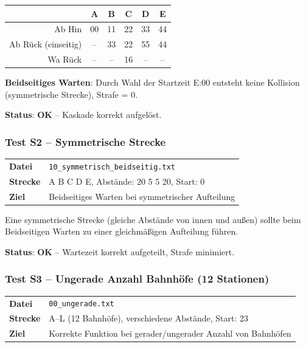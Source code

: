 \documentclass[12pt,a4paper]{article}
\newcommand{\pass}{\textcolor{passgreen}{\textbf{OK}}}
\begin{document}
\begin{center}
\begin{tabular}{r|ccccc}
 & A & B & C & D & E \\
\hline
Ab Hin & 00 & 11 & 22 & 33 & 44 \\
\hline
Ab Rück (einseitig) & -- & 33 & 22 & 55 & 44 \\
Wa Rück & -- & -- & 16 & -- & -- \\
\end{tabular}
\end{center}

\textbf{Beidseitiges Warten}: Durch Wahl der Startzeit E:00 entsteht keine Kollision (symmetrische Strecke), Strafe = 0.

\textbf{Status}: \pass{} -- Kaskade korrekt aufgelöst.

\subsubsection{Test S2 -- Symmetrische Strecke}

\begin{center}
\begin{tabular}{ll}
\toprule
\textbf{Datei} & \texttt{10\_symmetrisch\_beidseitig.txt} \\
\textbf{Strecke} & A B C D E, Abstände: 20 5 5 20, Start: 0 \\
\textbf{Ziel} & Beidseitiges Warten bei symmetrischer Aufteilung \\
\bottomrule
\end{tabular}
\end{center}

Eine symmetrische Strecke (gleiche Abstände von innen und außen) sollte beim Beidseitigen Warten zu einer gleichmäßigen Aufteilung führen.

\textbf{Status}: \pass{} -- Wartezeit korrekt aufgeteilt, Strafe minimiert.

\subsubsection{Test S3 -- Ungerade Anzahl Bahnhöfe (12 Stationen)}

\begin{center}
\begin{tabular}{ll}
\toprule
\textbf{Datei} & \texttt{00\_ungerade.txt} \\
\textbf{Strecke} & A--L (12 Bahnhöfe), verschiedene Abstände, Start: 23 \\
\textbf{Ziel} & Korrekte Funktion bei gerader/ungerader Anzahl von Bahnhöfen \\
\bottomrule
\end{tabular}
\end{center}
\end{document}

